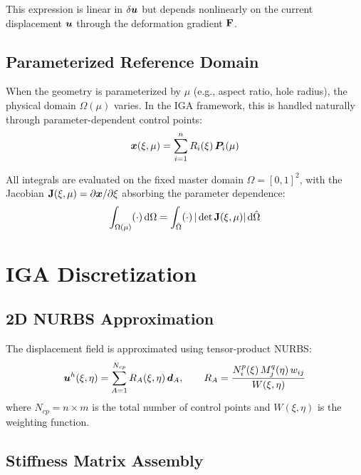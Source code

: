 This expression is linear in $\delta\bm{u}$ but depends nonlinearly on the current displacement $\bm{u}$ through the deformation gradient $\mathbf{F}$.

\subsection{Parameterized Reference Domain}

When the geometry is parameterized by $\mu$ (e.g., aspect ratio, hole radius), the physical domain $\Omega(\mu)$ varies. In the IGA framework, this is handled naturally through parameter-dependent control points:
\begin{equation}
    \bm{x}(\xi, \mu) = \sum_{i=1}^{n} R_i(\xi) \, \bm{P}_i(\mu)
\end{equation}

All integrals are evaluated on the fixed master domain $\hat{\Omega} = [0,1]^2$, with the Jacobian $\mathbf{J}(\xi, \mu) = \partial\bm{x}/\partial\xi$ absorbing the parameter dependence:
\begin{equation}
    \int_{\Omega(\mu)} (\cdot) \, \mathrm{d}\Omega = \int_{\hat{\Omega}} (\cdot) \, |\det\mathbf{J}(\xi, \mu)| \, \mathrm{d}\hat{\Omega}
\end{equation}

\section{IGA Discretization}
\label{sec:iga-discretization}

\subsection{2D NURBS Approximation}

The displacement field is approximated using tensor-product NURBS:
\begin{equation}
    \bm{u}^h(\xi, \eta) = \sum_{A=1}^{N_{cp}} R_A(\xi, \eta) \, \bm{d}_A, \qquad R_A = \frac{N_i^p(\xi) \, M_j^q(\eta) \, w_{ij}}{W(\xi,\eta)}
\end{equation}
where $N_{cp} = n \times m$ is the total number of control points and $W(\xi,\eta)$ is the weighting function.

\subsection{Stiffness Matrix Assembly}

